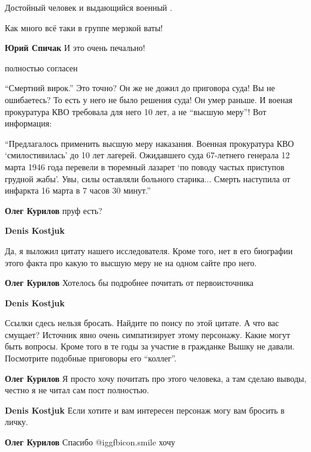 \begin{itemize}
Достойный человек и выдающийся военный .

Как много всё таки в группе мерзкой ваты!

\begin{itemize} %
\textbf{Юрий Спичак} И это очень печально!

полностью согласен
\end{itemize} %


\enquote{Смертний вирок.} Это точно? Он же не дожил до приговора суда! Вы не
ошибаетесь? То есть у него не было решения суда! Он умер раньше. И военая
прокуратура КВО требовала для него 10 лет, а не \enquote{высшую меру}! Вот информация:

\enquote{Предлагалось применить высшую меру наказания. Военная прокуратура КВО
\enquote{смилостивилась} до 10 лет лагерей.
Ожидавшего суда 67-летнего генерала 12 марта 1946 года перевели в тюремный
лазарет \enquote{по поводу частых приступов грудной жабы}. Увы, силы оставляли больного
старика... Смерть наступила от инфаркта 16 марта в 7 часов 30 минут.}

\begin{itemize} %
\textbf{Олег Курилов} пруф есть?

\begin{itemize} %
\textbf{Denis Kostjuk} 

Да, я выложил цитату нашего исследователя. Кроме того, нет в его биографии
этого факта про какую то высшую меру не на одном сайте про него.

\textbf{Олег Курилов} Хотелось бы подробнее почитать от первоисточника

\textbf{Denis Kostjuk} 

Ссылки сдесь нельзя бросать. Найдите по поису по этой цитате. А что вас
смущает? Источник явно очень симпатизирует этому персонажу. Какие могут быть
вопросы. Кроме того в те годы за участие в гражданке Вышку не давали.
Посмотрите подобные приговоры его \enquote{коллег}.


\textbf{Олег Курилов} Я просто хочу почитать про этого человека, а там сделаю выводы, честно я не читал сам пост полностью.

\textbf{Denis Kostjuk} Если хотите и вам интересен персонаж могу вам бросить в личку.

\textbf{Олег Курилов} Спасибо  @igg{fbicon.smile}  хочу


\end{itemize}
\end{itemize}
\end{itemize}
